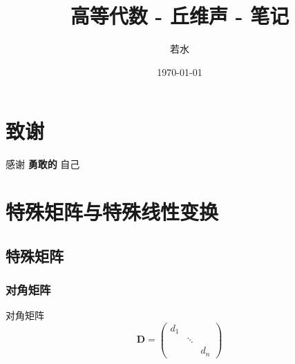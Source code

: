 \documentclass[lang = cn, scheme = chinese, thmcnt = section]{elegantbook}
\title{高等代数 - 丘维声 - 笔记}                %
\author{若水}                        %
\date{\today}                       %
\newcommand{\bs}{\boldsymbol}          %
\begin{document}
\maketitle       %

\frontmatter     %

\chapter*{致谢}


\vspace*{\fill}
\begin{center}
	
	\large{感谢 \textbf{ 勇敢的 } 自己}
	
\end{center}
\vspace*{\fill}

\tableofcontents %

\mainmatter      %

\chapter{特殊矩阵与特殊线性变换}

\section{特殊矩阵}

\subsection{对角矩阵}

\begin{definition}{对角矩阵}
	$$
	\bs{D}=\begin{pmatrix}
		d_1 & & \\
		& \ddots & \\
		& & d_n
	\end{pmatrix}
	$$
\end{definition}
\end{document}
